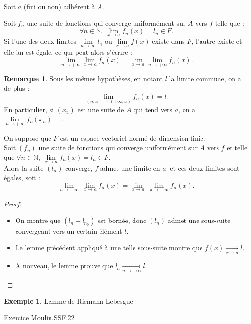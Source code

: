 \documentclass[french]{article}
\newcommand{\N}{\mathbb{N}}
\theoremstyle{plain}
\theoremstyle{definition}
\newtheorem*{ex}{Exemple}
\newtheorem*{rmq}{Remarque}
\theoremstyle{remark}
\begin{document}
Soit $a$ (fini ou non) adhérent à $A$.

\begin{lem}%
	Soit $f_n$ une suite de fonctions qui converge uniformément sur $A$ vers $f$ telle que :
	$$\forall n\in\N,\ \underset{x\to a}{\lim}f_n(x)=l_n\in F.$$
	Si l'une des deux limites $\underset{n\to\infty}{\lim}l_n$ ou $\underset{x\to a}{\lim}f(x)$ existe dans $F$, l'autre existe et elle lui est égale, ce qui peut alors s'écrire :
	$$\underset{n\to+\infty}{\lim}\underset{x\to a}{\lim}f_n(x)=\underset{x\to a}{\lim}\underset{n\to+\infty}{\lim}f_n(x).$$
\end{lem}

\begin{rmq}
	Sous les mêmes hypothèses, en notant $l$ la limite commune, on a de plus :
	$$\underset{(n,x)\to(+\infty,a)}{\lim}f_n(x)=l.$$
	En particulier, si $(x_n)$ est une suite de $A$ qui tend vers $a$, on a $\underset{n\to+\infty}{\lim}f_n(x_n)=$.
\end{rmq}

\begin{thm}%
	On suppose que $F$ est un espace vectoriel normé de dimension finie. \\
	Soit $(f_n)$ une suite de fonctions qui converge uniformément sur $A$ vers $f$ et telle que $\forall n\in\N,\ \underset{x\to a}{\lim}f_n(x)=l_n\in F$. \\
	Alors la suite $(l_n)$ converge, $f$ admet une limite en $a$, et ces deux limites sont égales, soit :
	$$\underset{n\to+\infty}{\lim}\ \underset{x\to a}{\lim}f_n(x)=\underset{x\to a}{\lim}\ \underset{n\to+\infty}{\lim}f_n(x).$$
\end{thm}
\begin{proof}
	\begin{itemize}
		\item On montre que $(l_n-l_{n_0})$ est bornée, donc $(l_n)$ admet une sous-suite convergeant vers un certain élément $l$.
		\item Le lemme précédent appliqué à une telle sous-suite montre que $f(x)\xrightarrow[x\to a]{}l$.
		\item A nouveau, le lemme prouve que $l_n\xrightarrow[n\to+\infty]{}l$.
	\end{itemize}
\end{proof}

\begin{ex}
	Lemme de Riemann-Lebesgue.
\end{ex}

Exercice Moulin.SSF.22
\end{document}
